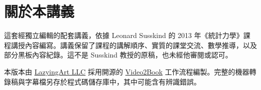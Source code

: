 \documentclass[11pt,oneside]{book}
\begin{document}
\frontmatter
\hypersetup{pageanchor=false}

\hypersetup{pageanchor=true}

\chapter*{關於本講義}
這套經獨立編輯的配套講義，依據 Leonard Susskind 的 2013 年《統計力學》課程講授內容編寫。講義保留了課程的講解順序、實質的課堂交流、數學推導，以及部分黑板內容紀錄。這不是 Susskind 教授的原稿，也未經他審閱或認可。

本版本由 \href{https://lazying.art}{LazyingArt LLC} 採用開源的 \href{https://github.com/lachlanchen/Video2Book}{Video2Book} 工作流程編製。完整的機器轉錄稿與字幕檔另存於程式碼儲存庫中，其中可能含有辨識錯誤。
\clearpage
\tableofcontents
\mainmatter










\end{document}
